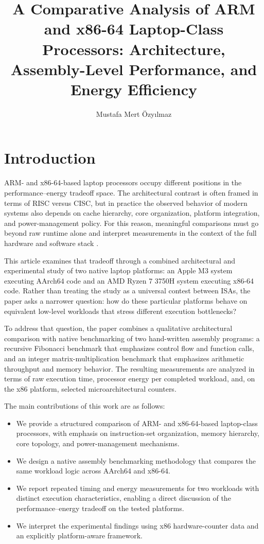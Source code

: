 \documentclass{tcsa}
\title{A Comparative Analysis of ARM and x86-64 Laptop-Class Processors: Architecture, Assembly-Level Performance, and Energy Efficiency}
\author[1,*]{Mustafa Mert Özyılmaz \orcid{0009-0004-3684-021X}}
\affil[1]{Sorbonne Université, Department of Computer Engineering, Paris Île-de-France, France, 75005}
\begin{document}
\raggedbottom
\maketitle

\section{Introduction}

ARM- and x86-64-based laptop processors occupy different positions in the
performance--energy tradeoff space. The architectural contrast is often framed in
terms of RISC versus CISC, but in practice the observed behavior of modern systems
also depends on cache hierarchy, core organization, platform integration, and
power-management policy. For this reason, meaningful comparisons must go beyond raw
runtime alone and interpret measurements in the context of the full hardware and
software stack \cite{hennessy_patterson_2019,blem2013}.

This article examines that tradeoff through a combined architectural and experimental
study of two native laptop platforms: an Apple M3 system executing AArch64 code and
an AMD Ryzen 7 3750H system executing x86-64 code. Rather than treating the study as
a universal contest between ISAs, the paper asks a narrower question: how do these
particular platforms behave on equivalent low-level workloads that stress different
execution bottlenecks?

To address that question, the paper combines a qualitative architectural comparison
with native benchmarking of two hand-written assembly programs: a recursive
Fibonacci benchmark that emphasizes control flow and function calls, and an integer
matrix-multiplication benchmark that emphasizes arithmetic throughput and memory
behavior. The resulting measurements are analyzed in terms of raw execution time,
processor energy per completed workload, and, on the x86 platform, selected
microarchitectural counters.

The main contributions of this work are as follows:
\begin{itemize}
    \item We provide a structured comparison of ARM- and x86-64-based laptop-class
    processors, with emphasis on instruction-set organization, memory hierarchy,
    core topology, and power-management mechanisms.
    \item We design a native assembly benchmarking methodology that compares the same
    workload logic across AArch64 and x86-64.
    \item We report repeated timing and energy measurements for two workloads with
    distinct execution characteristics, enabling a direct discussion of the
    performance--energy tradeoff on the tested platforms.
    \item We interpret the experimental findings using x86 hardware-counter data and
    an explicitly platform-aware framework.
\end{itemize}
\end{document}
